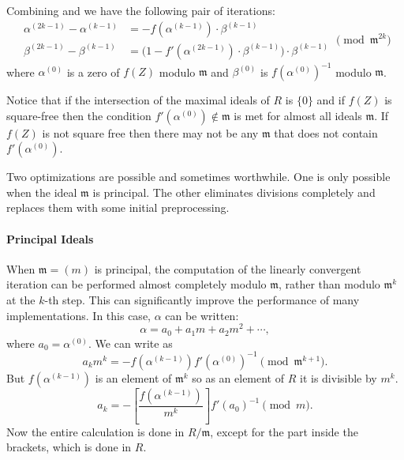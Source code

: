 Combining  and  we have the
following pair of iterations: 
\begin{equation}
\label{Quasi:UNewton:Eq}
\begin{aligned}
  \alpha^{(2k-1)} - \alpha^{(k-1)} &= - f(\alpha^{(k-1)}) \cdot
    \beta^{(k-1)} \\
  \beta^{(2k-1)} - \beta^{(k-1)} & 
     = \bigl(1 - f'(\alpha^{(2k-1)}) \cdot \beta^{(k-1)}\bigr) \cdot
       \beta^{(k-1)}
\end{aligned}
\pmod{\mathfrak{m}^{2k}}
\end{equation}
where $\alpha^{(0)}$ is a zero of $f(Z)$ modulo $\mathfrak{m}$ and
$\beta^{(0)}$ is $f(\alpha^{(0)})^{-1}$ modulo $\mathfrak{m}$.  

Notice that if the intersection of the maximal ideals of $R$ is
$\{0\}$ and if $f(Z)$ is square-free then the condition
$f'(\alpha^{(0)}) \not\in \mathfrak{m}$ is met for almost all ideals
$\mathfrak{m}$.  If $f(Z)$ is not square free then there may not be any
$\mathfrak{m}$ that does not contain $f'(\alpha^{(0)})$.

\medskip
Two optimizations are possible and sometimes worthwhile.  One is only
possible when the ideal $\mathfrak{m}$ is principal.  The other
eliminates divisions completely and replaces them with some initial
preprocessing.

\paragraph{Principal Ideals}

When $\mathfrak{m} = (m)$ is principal, the computation of the
linearly convergent iteration can be performed almost completely
modulo $\mathfrak{m}$, rather than modulo $\mathfrak{m}^{k}$ at the
$k$-th step.  This can significantly improve the performance of many
implementations.  In this case, $\alpha$ can be written:
\[
\alpha = a_0 + a_1 m + a_2 m^2 + \cdots,
\]
where $a_0 = \alpha^{(0)}$.  We can write  as
\[
a_k m^k = -f(\alpha^{(k-1)}) f'(\alpha^{(0)})^{-1} \pmod{\mathfrak{m}^{k+1}}.
\]
But $f(\alpha^{(k-1)})$ is an element of $\mathfrak{m}^k$ so as an element of
$R$ it is divisible by $m^k$.
\begin{equation}
a_k = - \left[\frac{ f(\alpha^{(k-1)})}{m^k}\right]
f'(a_0)^{-1} \pmod{m}.
\label{EQ:5}
\end{equation}
Now the entire calculation is done in $R/\mathfrak{m}$, except for the part
inside the brackets, which is done in $R$.

